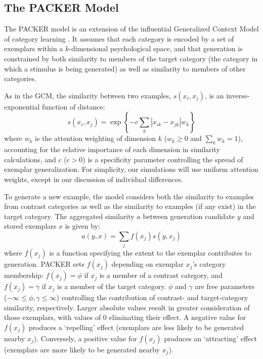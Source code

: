 \documentclass[12pt]{article}
\begin{document}
\begin{flushleft}
\clearpage

\section{The PACKER Model}

The PACKER model is an extension of the influential Generalized Context Model of category learning \citep[GCM;][]{nosofsky1984choice}. It assumes that each category is encoded by a set of exemplars within a $k$-dimensional psychological space, and that generation is constrained by both similarity to members of the target category (the category in which a stimulus is being generated) as well as similarity to members of other categories. 

As in the GCM, the similarity between two examples, $s\left(x_i, x_j\right)$, is an inverse-exponential function of distance:
% 
\begin{equation}
  s\left(x_i,x_j\right) = \exp \left\{ -c \sum_{k}{ \left| x_{ik} - x_{jk} \right|}w_k \right\}
  \label{eq:similarity}
\end{equation}
% 
where $w_k$ is the attention weighting of dimension $k$ ($w_k \geq 0$ and $\sum_k{w_k} = 1$), accounting for the relative importance of each dimension in similarity calculations, and $c$ ($c>0$) is a specificity parameter controlling the spread of exemplar generalization. For simplicity, our simulations will use uniform attention weights, except in our discussion of individual differences.  

To generate a new example, the model considers both the similarity to examples from contrast categories as well as the similarity to examples (if any exist) in the target category. The aggregated similarity $a$ between generation candidate $y$ and stored exemplars $x$ is given by:
% 
\begin{equation}
    a(y, x) = \sum_j{f(x_j) s(y, x_j)}
\end{equation}
% 
where $f(x_j)$ is a function specifying the extent to the exemplar contributes to generation. PACKER sets $f(x_j)$ depending on exemplar $x_j$'s category membership: $f(x_j) = \phi$ if $x_j$ is a member of a contrast category, and $f(x_j) = \gamma$ if $x_j$ is a member of the target category. $\phi$ and $\gamma$ are free parameters ($-\infty \leq \phi, \gamma \leq \infty$) controlling the contribution of contrast- and target-category similarity, respectively. Larger absolute values result in greater consideration of those exemplars, with values of 0 eliminating their effect. A negative value for $f(x_j)$ produces a `repelling' effect (exemplars are less likely to be generated nearby $x_j$). Conversely, a positive value for $f(x_j)$ produces an `attracting' effect (exemplars are more likely to be generated nearby $x_j$). 


\end{flushleft}
\end{document}
